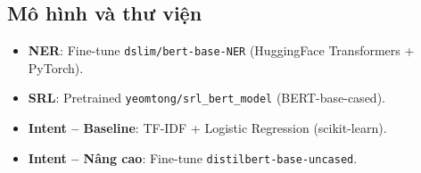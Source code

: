 \subsection{Mô hình và thư viện}

\begin{itemize}
    \item \textbf{NER}: Fine-tune \texttt{dslim/bert-base-NER} (HuggingFace Transformers + PyTorch).
    \item \textbf{SRL}: Pretrained \texttt{yeomtong/srl\_bert\_model} (BERT-base-cased).
    \item \textbf{Intent -- Baseline}: TF-IDF + Logistic Regression (scikit-learn).
    \item \textbf{Intent -- Nâng cao}: Fine-tune \texttt{distilbert-base-uncased}.
\end{itemize}